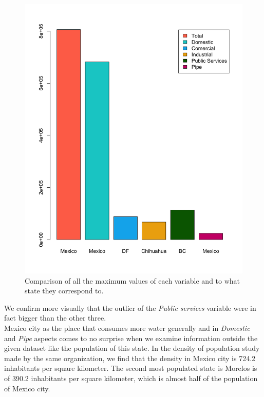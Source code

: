 \documentclass{article}
\begin{document}
\begin{figure}[htp]
	\centering
	\includegraphics[width=\linewidth]{histo.png}
	\caption{Comparison of all the maximum values of each variable and to what state they correspond to.}\label{fig3}
\end{figure}

\clearpage
We confirm more visually that the outlier of the \textit{Public services} variable were in fact bigger than the other three.\\

Mexico city as the place that consumes more water generally and in \textit{Domestic} and \textit{Pipe} aspects comes to no surprise when we examine information outside the given dataset like the population of this state. In the density of population study made by the same organization, we find that the density in Mexico city is 724.2 inhabitants per square kilometer. The second most populated state is Morelos is of 390.2 inhabitants per square kilometer, which is almost half of the population of Mexico city\cite{ine2}.\\
\end{document}
